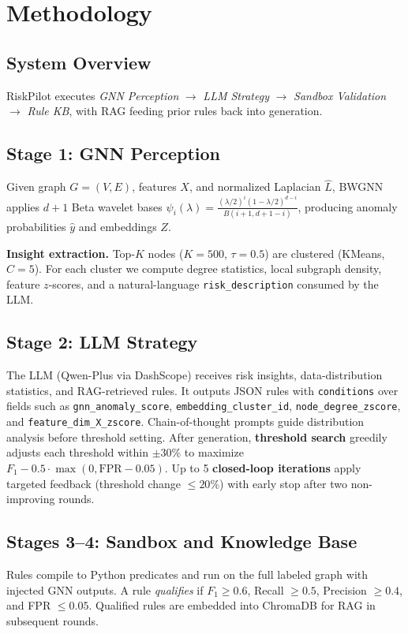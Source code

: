 \documentclass[sigconf,nonacm]{acmart}
\begin{document}
\section{Methodology}
\label{sec:method}

\subsection{System Overview}
RiskPilot executes \textit{GNN Perception} $\rightarrow$ \textit{LLM Strategy} $\rightarrow$ \textit{Sandbox Validation} $\rightarrow$ \textit{Rule KB}, with RAG feeding prior rules back into generation.

\subsection{Stage 1: GNN Perception}
Given graph $G{=}(V,E)$, features $X$, and normalized Laplacian $\hat{L}$, BWGNN applies $d{+}1$ Beta wavelet bases
$\psi_i(\lambda) = \frac{(\lambda/2)^i(1-\lambda/2)^{d-i}}{B(i{+}1,d{+}1-i)}$,
producing anomaly probabilities $\hat{y}$ and embeddings $Z$.

\textbf{Insight extraction.} Top-$K$ nodes ($K{=}500$, $\tau{=}0.5$) are clustered (KMeans, $C{=}5$).
For each cluster we compute degree statistics, local subgraph density, feature $z$-scores, and a natural-language \texttt{risk\_description} consumed by the LLM.

\subsection{Stage 2: LLM Strategy}
The LLM (Qwen-Plus via DashScope) receives risk insights, data-distribution statistics, and RAG-retrieved rules.
It outputs JSON rules with \texttt{conditions} over fields such as \texttt{gnn\_anomaly\_score}, \texttt{embedding\_cluster\_id}, \texttt{node\_degree\_zscore}, and \texttt{feature\_dim\_X\_zscore}.
Chain-of-thought prompts guide distribution analysis before threshold setting.
After generation, \textbf{threshold search} greedily adjusts each threshold within $\pm 30\%$ to maximize $F_1 - 0.5 \cdot \max(0, \text{FPR} - 0.05)$.
Up to 5 \textbf{closed-loop iterations} apply targeted feedback (threshold change $\leq 20\%$) with early stop after two non-improving rounds.

\subsection{Stages 3--4: Sandbox and Knowledge Base}
Rules compile to Python predicates and run on the full labeled graph with injected GNN outputs.
A rule \textit{qualifies} if $F_1 \geq 0.6$, Recall $\geq 0.5$, Precision $\geq 0.4$, and FPR $\leq 0.05$.
Qualified rules are embedded into ChromaDB for RAG in subsequent rounds.
\end{document}
